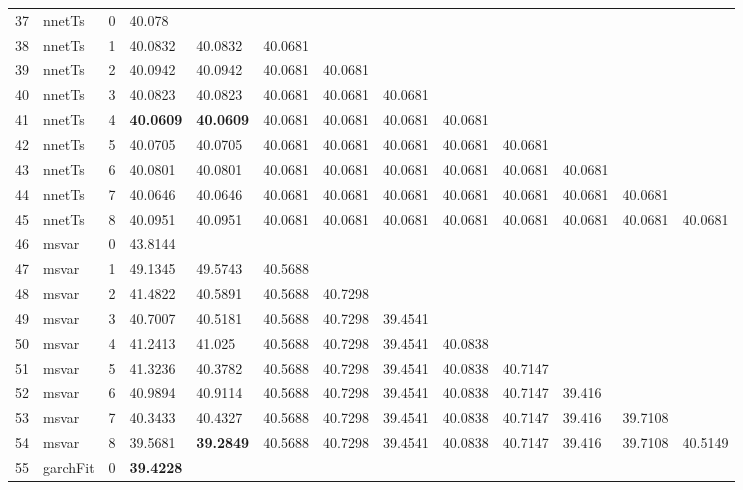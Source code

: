 \documentclass[10pt,a4paper]{article}
\begin{document}
\begin{table}[ht]
\begin{tabular}{rlrllllllllll}
   \hline
37 & nnetTs &     0 & 40.078 &  &  &  &  &  &  &  &  &  \\ 
  38 & nnetTs &     1 & 40.0832 & 40.0832 & 40.0681 &  &  &  &  &  &  &  \\ 
  39 & nnetTs &     2 & 40.0942 & 40.0942 & 40.0681 & 40.0681 &  &  &  &  &  &  \\ 
  40 & nnetTs &     3 & 40.0823 & 40.0823 & 40.0681 & 40.0681 & 40.0681 &  &  &  &  &  \\ 
  41 & nnetTs &     4 & \textbf{40.0609} & \textbf{40.0609} & 40.0681 & 40.0681 & 40.0681 & 40.0681 &  &  &  &  \\ 
  42 & nnetTs &     5 & 40.0705 & 40.0705 & 40.0681 & 40.0681 & 40.0681 & 40.0681 & 40.0681 &  &  &  \\ 
  43 & nnetTs &     6 & 40.0801 & 40.0801 & 40.0681 & 40.0681 & 40.0681 & 40.0681 & 40.0681 & 40.0681 &  &  \\ 
  44 & nnetTs &     7 & 40.0646 & 40.0646 & 40.0681 & 40.0681 & 40.0681 & 40.0681 & 40.0681 & 40.0681 & 40.0681 &  \\ 
  45 & nnetTs &     8 & 40.0951 & 40.0951 & 40.0681 & 40.0681 & 40.0681 & 40.0681 & 40.0681 & 40.0681 & 40.0681 & 40.0681 \\ 
   \hline
46 & msvar &     0 & 43.8144 &  &  &  &  &  &  &  &  &  \\ 
  47 & msvar &     1 & 49.1345 & 49.5743 & 40.5688 &  &  &  &  &  &  &  \\ 
  48 & msvar &     2 & 41.4822 & 40.5891 & 40.5688 & 40.7298 &  &  &  &  &  &  \\ 
  49 & msvar &     3 & 40.7007 & 40.5181 & 40.5688 & 40.7298 & 39.4541 &  &  &  &  &  \\ 
  50 & msvar &     4 & 41.2413 & 41.025 & 40.5688 & 40.7298 & 39.4541 & 40.0838 &  &  &  &  \\ 
  51 & msvar &     5 & 41.3236 & 40.3782 & 40.5688 & 40.7298 & 39.4541 & 40.0838 & 40.7147 &  &  &  \\ 
  52 & msvar &     6 & 40.9894 & 40.9114 & 40.5688 & 40.7298 & 39.4541 & 40.0838 & 40.7147 & 39.416 &  &  \\ 
  53 & msvar &     7 & 40.3433 & 40.4327 & 40.5688 & 40.7298 & 39.4541 & 40.0838 & 40.7147 & 39.416 & 39.7108 &  \\ 
  54 & msvar &     8 & 39.5681 & \textbf{39.2849} & 40.5688 & 40.7298 & 39.4541 & 40.0838 & 40.7147 & 39.416 & 39.7108 & 40.5149 \\ 
   \hline
55 & garchFit &     0 & \textbf{39.4228} &  &  &  &  &  &  &  &  &  \\ 

\end{tabular}
\end{table}
\end{document}
